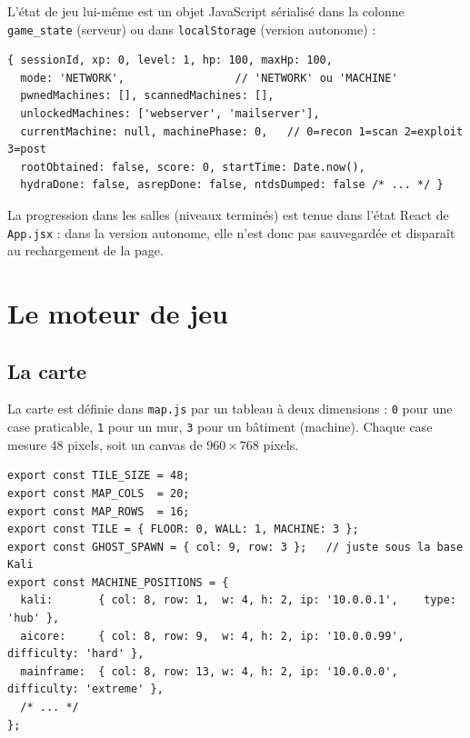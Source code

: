 \documentclass[11pt,a4paper]{report}
\newcommand{\file}[1]{\texttt{\nolinkurl{#1}}}
\begin{document}
L'\'etat de jeu lui-m\^eme est un objet JavaScript s\'erialis\'e dans la colonne
\texttt{game\_state} (serveur) ou dans \texttt{localStorage} (version autonome) :

\begin{lstlisting}[style=js,caption={Etat initial d'une partie (\file{frontend/src/engine/gameState.js})}]
{ sessionId, xp: 0, level: 1, hp: 100, maxHp: 100,
  mode: 'NETWORK',                 // 'NETWORK' ou 'MACHINE'
  pwnedMachines: [], scannedMachines: [],
  unlockedMachines: ['webserver', 'mailserver'],
  currentMachine: null, machinePhase: 0,   // 0=recon 1=scan 2=exploit 3=post
  rootObtained: false, score: 0, startTime: Date.now(),
  hydraDone: false, asrepDone: false, ntdsDumped: false /* ... */ }
\end{lstlisting}

La progression dans les salles (niveaux termin\'es) est tenue dans l'\'etat React de
\file{App.jsx} : dans la version autonome, elle n'est donc pas sauvegard\'ee et
dispara\^it au rechargement de la page.

\chapter{Le moteur de jeu}
\label{chap:moteur}

\section{La carte}

La carte est d\'efinie dans \file{map.js} par un tableau \`a deux dimensions : \texttt{0}
pour une case praticable, \texttt{1} pour un mur, \texttt{3} pour un b\^atiment (machine).
Chaque case mesure 48 pixels, soit un canvas de $960 \times 768$ pixels.

\begin{lstlisting}[style=js,caption={Extrait de \file{map.js}}]
export const TILE_SIZE = 48;
export const MAP_COLS  = 20;
export const MAP_ROWS  = 16;
export const TILE = { FLOOR: 0, WALL: 1, MACHINE: 3 };
export const GHOST_SPAWN = { col: 9, row: 3 };   // juste sous la base Kali
export const MACHINE_POSITIONS = {
  kali:       { col: 8, row: 1,  w: 4, h: 2, ip: '10.0.0.1',    type: 'hub' },
  aicore:     { col: 8, row: 9,  w: 4, h: 2, ip: '10.0.0.99',   difficulty: 'hard' },
  mainframe:  { col: 8, row: 13, w: 4, h: 2, ip: '10.0.0.0',    difficulty: 'extreme' },
  /* ... */
};
\end{lstlisting}
\end{document}
